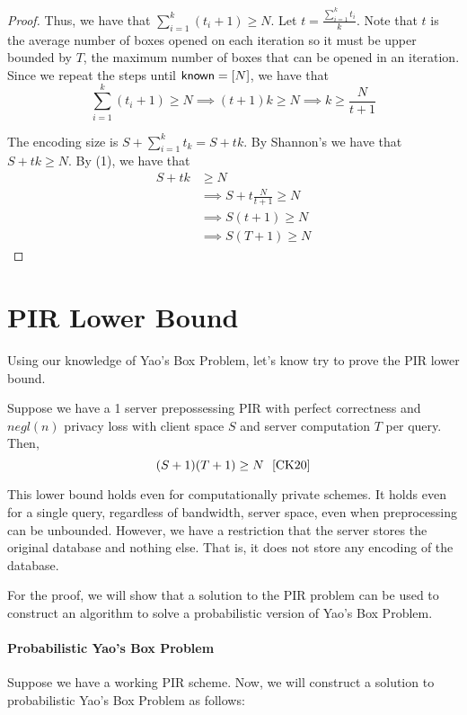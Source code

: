 \begin{proof}
    Thus, we have that $\sum_{i = 1}^k (t_i + 1)\ge N$. Let $t = \frac{\sum_{i = 1}^k t_i}{k}$. Note that $t$ is the average number of boxes opened on each iteration so it must be upper bounded by $T$, the maximum number of boxes that can be opened in an iteration. Since we repeat the steps until ${\sf known} = [N]$, we have that
    \[\sum_{i = 1}^k (t_i + 1)\ge N \implies (t+1)k \ge N \implies k\ge \frac{N}{t+1} \tag{1}\]

    The encoding size is $S + \sum_{i=1}^k t_k = S + tk$. By Shannon's we have that $S + tk \ge N$. By (1), we have that 
    \begin{align*}
        S + tk &\ge N \\
        &\implies S + t \frac{N}{t+1} \ge N \tag{By (1)}\\
        &\implies S(t+1) \ge N \tag{Simplification}\\
        &\implies S(T+1) \ge N \tag{As $t \le T$}
    \end{align*}
\end{proof}

\section{PIR Lower Bound}
Using our knowledge of Yao's Box Problem, let's know try to prove the PIR lower bound.
\begin{theorem}
    Suppose we have a 1 server prepossessing PIR with perfect correctness and $negl(n)$ privacy loss with client space $S$ and server computation $T$ per query. Then,
    \[(S+1)(T+1) \ge  N \ \ \cite{CK20}\]
\end{theorem}
This lower bound holds even for computationally private schemes. It holds even for a single query, regardless of bandwidth, server space, even when preprocessing can be unbounded. However, we have a restriction that the server stores the original database and nothing else. That is, it does not store any encoding of the database.

\vspace{5mm}

For the proof, we will show that a solution to the PIR problem can be used to construct an algorithm to solve a probabilistic version of Yao's Box Problem.

\paragraph{Probabilistic Yao's Box Problem}
Suppose we have a working PIR scheme. Now, we will construct a solution to probabilistic Yao's Box Problem as follows:

